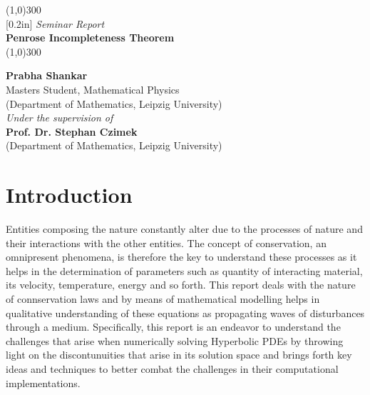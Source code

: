 \documentclass[11pt, a4paper]{report}
\theoremstyle{bfnote}
\begin{document}
\begin{titlepage}
    \begin{center}
    \line(1,0){300}\\
    [0.2in]
    \normalsize{\emph {Seminar Report}}\\	
    \Huge{\bfseries Penrose Incompleteness Theorem}\\
    [-0.12in]
    \line(1,0){300}\\
    
    \vspace{3in}
    
    \LARGE{\bfseries {Prabha Shankar}}\\
    \small{Masters Student, Mathematical Physics}\\
    \small{(Department of Mathematics, Leipzig University)}\\
    
    \vspace{3cm}
    \normalsize{\emph {Under the supervision of}}\\
    \large{\bfseries {Prof. Dr. Stephan Czimek}}\\
    \small{(Department of Mathematics, Leipzig University)}\\
    
    \end{center}
\end{titlepage}

\section*{Introduction}
Entities composing the nature constantly alter due to the processes of nature
and their interactions with the other entities. The concept of conservation, an
omnipresent phenomena, is therefore the key to understand these processes as it
helps in the determination of parameters such as quantity of interacting
material, its velocity, temperature, energy and so forth. This report deals with
the nature of connservation laws and by means of mathematical modelling helps in
qualitative understanding of these equations as propagating waves of
disturbances through a medium. Specifically, this report is an endeavor to
understand the challenges that arise when numerically solving Hyperbolic PDEs by
throwing light on the discontunuities that arise in its solution space and
brings forth key ideas and techniques to better combat the challenges in their
computational implementations. 
\end{document}
